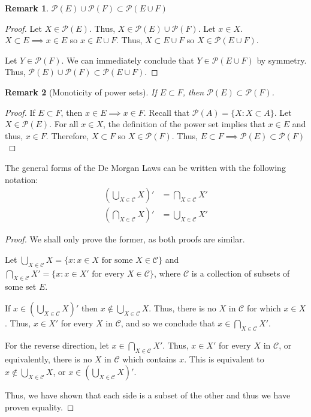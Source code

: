 \documentclass[12pt]{article}
\newtheorem{remark}{Remark}
\begin{document}
\begin{remark}
    $\mathcal{P}(E) \cup \mathcal{P}(F) \subset \mathcal{P}(E \cup F)$
\end{remark}
\begin{proof}
    Let $X \in \mathcal{P}(E)$. Thus, $X \in \mathcal{P}(E) \cup \mathcal{P}(F)$. Let $x \in X$. $X \subset
    E \implies x \in E$ so $x\in E \cup F$. Thus, $X\subset E \cup F$ so $X\in \mathcal{P}(E \cup F)$.

    Let $Y \in \mathcal{P}(F)$. We can immediately conclude that $Y \in \mathcal{P}(E \cup F)$ by symmetry.
    Thus, $\mathcal{P}(E) \cup \mathcal{P}(F) \subset \mathcal{P}(E \cup F)$.
\end{proof}

\begin{remark}[Monoticity of power sets]
    If $E\subset F$, then $\mathcal{P}(E) \subset \mathcal{P}(F)$.
\end{remark}
\begin{proof}
    If $E\subset F$, then $x \in E \implies x \in F$. Recall that $\mathcal{P}(A) = \{X: X\subset A\}$.
    Let $X\in \mathcal{P}(E)$. For all $x \in X$, the definition of the power set implies that $x\in E$
    and thus, $x \in F$. Therefore, $X \subset F$ so $X \in \mathcal{P}(F)$. Thus, $E\subset F \implies \mathcal{P}(E) \subset \mathcal{P}(F)$
\end{proof}

The general forms of the De Morgan Laws can be written with the following notation:
\begin{align}
    \left(\bigcup_{X \in \mathcal{C}}X\right)' &= \bigcap_{X \in \mathcal{C}}X'\\
    \left(\bigcap_{X \in \mathcal{C}}X\right)' &= \bigcup_{X \in \mathcal{C}}X'
\end{align}
\begin{proof}
    We shall only prove the former, as both proofs are similar.

    Let $\bigcup_{X \in \mathcal{C}}X = \{x: x \in X \text{ for some } X \in \mathcal{C}\}$ and $\bigcap_{X \in \mathcal{C}}X'
    = \{x: x \in X' \text{ for every } X \in \mathcal{C}\}$, where $\mathcal{C}$ is a collection of subsets of
    some set $E$.

    If $x \in \left(\bigcup_{X \in \mathcal{C}}X\right)'$ then $x \notin \bigcup_{X \in \mathcal{C}}X$. Thus,
    there is no $X$ in $\mathcal{C}$ for which $x \in X$. Thus, $x \in X'$ for every $X$ in $\mathcal{C}$, and so
    we conclude that $x \in \bigcap_{X \in \mathcal{C}}X'$.

    For the reverse direction, let $x \in \bigcap_{X \in \mathcal{C}}X'$. Thus, $x \in X'$ for every
    $X$ in $\mathcal{C}$, or equivalently, there is no $X$ in $\mathcal{C}$ which contains $x$. This is
    equivalent to $x \notin \bigcup_{X \in \mathcal{C}}X$, or $x \in (\bigcup_{X \in \mathcal{C}}X)'$.

    Thus, we have shown that each side is a subset of the other and thus we have proven equality.
\end{proof}
\end{document}
